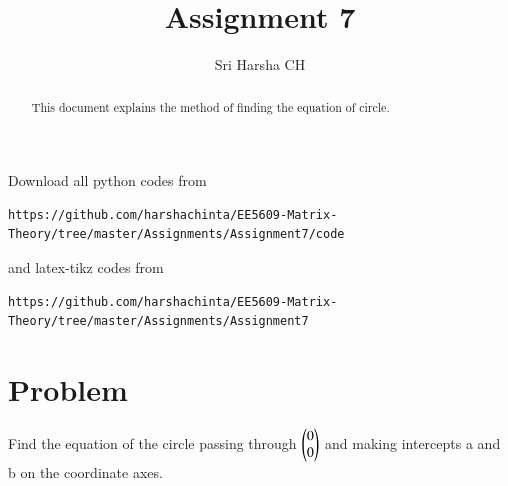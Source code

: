 \documentclass[journal,12pt,twocolumn]{IEEEtran}
\begin{document}
\renewcommand{\thefigure}{\theproblem}

\def\putbox#1#2#3{\makebox[0in][l]{\makebox[#1][l]{}\raisebox{\baselineskip}[0in][0in]{\raisebox{#2}[0in][0in]{#3}}}}
     \def\rightbox#1{\makebox[0in][r]{#1}}
     \def\centbox#1{\makebox[0in]{#1}}
     \def\topbox#1{\raisebox{-\baselineskip}[0in][0in]{#1}}
     \def\midbox#1{\raisebox{-0.5\baselineskip}[0in][0in]{#1}}
\vspace{3cm}
\title{Assignment 7}
\author{Sri Harsha CH}

\maketitle
\newpage

\bigskip
\renewcommand{\thefigure}{\theenumi}
\renewcommand{\thetable}{\theenumi}

\begin{abstract}
This document explains the method of finding the equation of circle.
\end{abstract}

Download all python codes from 
\begin{lstlisting}
https://github.com/harshachinta/EE5609-Matrix-Theory/tree/master/Assignments/Assignment7/code
\end{lstlisting}
%
and latex-tikz codes from 
%
\begin{lstlisting}
https://github.com/harshachinta/EE5609-Matrix-Theory/tree/master/Assignments/Assignment7
\end{lstlisting}
%
\section{Problem}
Find the equation of the circle passing through $\begin{pmatrix}0\\0\end{pmatrix}$ and making intercepts a and b on the coordinate axes.
\end{document}
